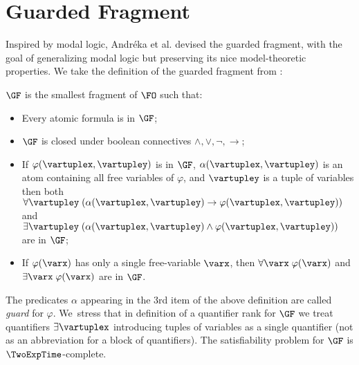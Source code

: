 \section{Guarded Fragment}
Inspired by modal logic, Andréka et al. devised the guarded fragment, with the goal of generalizing modal logic but preserving its nice model-theoretic properties\cite{AndrekaNB98}.
We take the definition of the guarded fragment from \cite{BednarczykJ22}:
\begin{definition}
  $\GF$ is the smallest fragment of $\FO$  such that:
  \begin{itemize}\itemsep0em
      \item Every atomic formula is in $\GF$;
      \item $\GF$ is closed under boolean connectives $\land, \lor, \neg, \to$;
      \item If $\varphi(\vartuplex, \vartupley)$ is in $\GF$, $\alpha(\vartuplex, \vartupley)$ is an atom containing all free variables of $\varphi$, and $\vartupley$ is a tuple of variables then both $\forall{\vartupley} \; (\alpha(\vartuplex, \vartupley) \to \varphi(\vartuplex, \vartupley))$ and $\exists{\vartupley} \; (\alpha(\vartuplex, \vartupley) \land \varphi(\vartuplex, \vartupley))$ are in $\GF$;
      \item If $\varphi(\varx)$ has only a single free-variable $\varx$, then $\forall{\varx}\; \varphi(\varx)$ and $\exists{\varx}\; \varphi(\varx)$ are in $\GF$.
  \end{itemize}
\end{definition}
The predicates $\alpha$ appearing in the 3rd item of the above definition are called \emph{guard} for $\varphi$.
We~stress that in definition of a quantifier rank for $\GF$ we treat quantifiers $\exists{\vartuplex}$ introducing tuples of variables as a single quantifier (not as an abbreviation for a block of quantifiers).
The satisfiability problem for $\GF$ is $\TwoExpTime$-complete.

